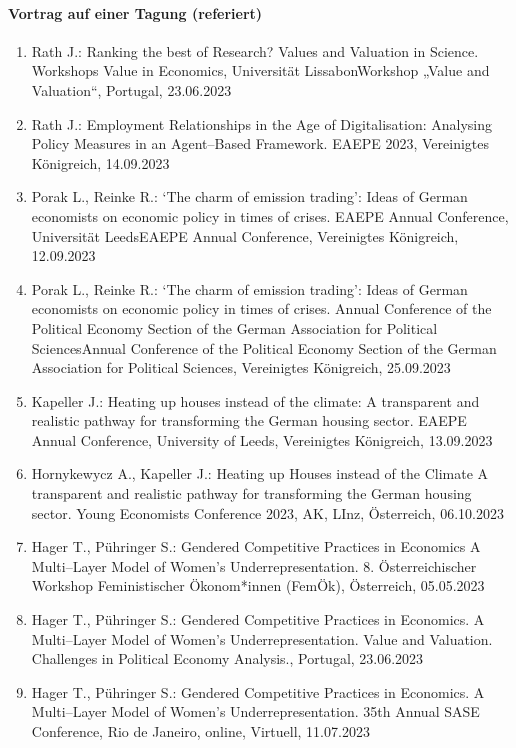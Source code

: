 \paragraph{Vortrag auf einer Tagung (referiert)}
\begin{enumerate}
	\item Rath J.: Ranking the best of Research? Values and Valuation in Science. Workshops Value in Economics, Universität LissabonWorkshop „Value and Valuation“, Portugal, 23.06.2023
	\item Rath J.: Employment Relationships in the Age of Digitalisation: Analysing Policy Measures in an Agent--Based Framework. EAEPE 2023, Vereinigtes Königreich, 14.09.2023
	\item Porak L., Reinke R.: ‘The charm of emission trading’: Ideas of German economists on economic policy in times of crises. EAEPE Annual Conference, Universität LeedsEAEPE Annual Conference, Vereinigtes Königreich, 12.09.2023
	\item Porak L., Reinke R.: ‘The charm of emission trading’: Ideas of German economists on economic policy in times of crises. Annual Conference of the Political Economy Section of the German Association for Political SciencesAnnual Conference of the Political Economy Section of the German Association for Political Sciences, Vereinigtes Königreich, 25.09.2023
	\item Kapeller J.: Heating up houses instead of the climate: A transparent and realistic pathway for transforming the German housing sector. EAEPE Annual Conference, University of Leeds, Vereinigtes Königreich, 13.09.2023
	\item Hornykewycz A., Kapeller J.: Heating up Houses instead of the Climate A transparent and realistic pathway for transforming the German housing sector. Young Economists Conference 2023, AK, LInz, Österreich, 06.10.2023
	\item Hager T., Pühringer S.: Gendered Competitive Practices in Economics A Multi--Layer Model of Women’s Underrepresentation. 8. Österreichischer Workshop Feministischer Ökonom*innen (FemÖk), Österreich, 05.05.2023
	\item Hager T., Pühringer S.: Gendered Competitive Practices in Economics. A Multi--Layer Model of Women’s Underrepresentation. Value and Valuation. Challenges in Political Economy Analysis., Portugal, 23.06.2023
	\item Hager T., Pühringer S.: Gendered Competitive Practices in Economics. A Multi--Layer Model of Women’s Underrepresentation. 35th Annual SASE Conference, Rio de Janeiro, online, Virtuell, 11.07.2023

\end{enumerate}
